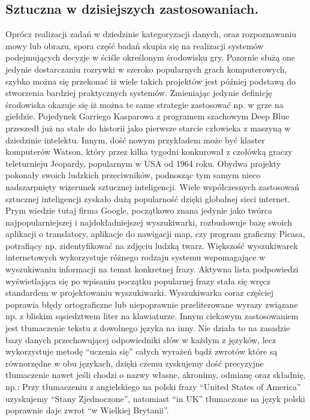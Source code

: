 \subsection{Sztuczna w dzisiejszych zastosowaniach.}
\begin{par}
Oprócz realizacji zadań w dziedzinie kategoryzacji danych, oraz rozpoznawaniu mowy lub obrazu, spora część badań skupia się na realizacji systemów podejmujących decyzje w ściśle określonym środowisku gry.
Pozornie służą one jedynie dostarczaniu rozrywki w szeroko popularnych grach komputerowych, szybko można się przekonać iż wiele takich projektów jest później podstawą do stworzenia bardziej praktycznych systemów. Zmieniając jedynie definicję środowiska okazuje się iż można te same strategie zastosować np. w grze na giełdzie.
Pojedynek Garriego Kasparowa z programem szachowym Deep Blue przeszedł już na stałe do historii jako pierwsze starcie człowieka z maszyną w dziedzinie intelektu. 
Innym, dość nowym przykładem może być klaster komputerów Watson, który przez kilka tygodni konkurował z czołówką graczy teleturnieju Jeopardy, popularnym w USA od 1964 roku.
Obydwa projekty pokonały swoich ludzkich przeciwników, podnosząc tym samym nieco nadszarpnięty wizerunek sztucznej inteligencji.
Wiele współczesnych zastosowań sztucznej inteligencji zyskało dużą popularność dzięki globalnej sieci internet.
Prym wiedzie tutaj firma Google, początkowo znana jedynie jako twórca najpopularniejszej i najdokładniejszej wyszukiwarki, rozbudowuje bazę swoich aplikacji o translatory,
aplikacje do nawigacji map, czy program graficzny Picasa, potrafiący np. zidentyfikować na zdjęciu ludzką twarz.
Większość wyszukiwarek internetowych wykorzystuje różnego rodzaju systemu wspomagające w wyszukiwaniu informacji na temat konkretnej frazy.
Aktywna lista podpowiedzi wyświetlająca się po wpisaniu początku popularnej frazy stała się wręcz standardem w projektowaniu wyszukiwarki.
Wyszukiwarka coraz częściej poprawia błędy ortograficzne lub niepoprawnie przeliterowane wyrazy związane np. z bliskim sąsiedztwem liter na klawiaturze.
Innym ciekawym zastosowaniem jest tłumaczenie tekstu z dowolnego języka na inny.
Nie działa to na zasadzie bazy danych przechowującej odpowiedniki słów w każdym z języków, lecz wykorzystuje metodę ``uczenia się'' całych wyrażeń bądź zwrotów które są równorzędne w obu językach, 
dzięki czemu zyskujemy dość precyzyjne tłumaczenie nawet jeśli chodzi o nazwy własne, akronimy, odmianę oraz składnię, np.: Przy tłumaczeniu z angielskiego na polski frazy ``United States of America'' uzyskujemy ``Stany Zjednoczone'', natomiast ``in UK'' tłumaczone na język polski poprawnie daje zwrot ``w Wielkiej Brytanii''.

\end{par}
